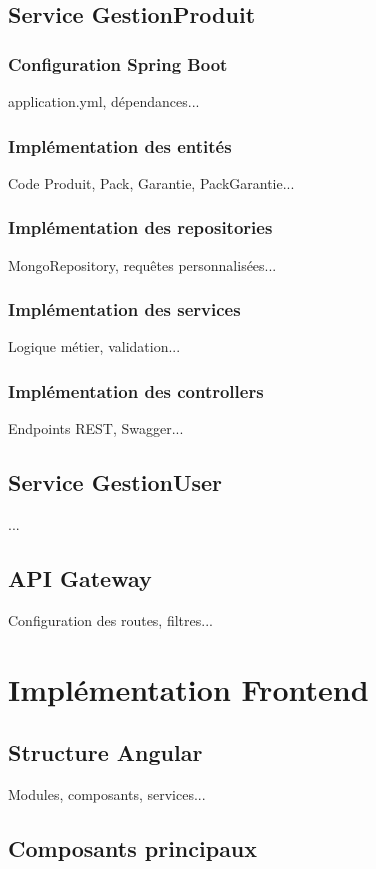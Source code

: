 \documentclass[12pt,a4paper]{report}
\begin{document}
\subsection{Service GestionProduit}
\subsubsection{Configuration Spring Boot}
application.yml, dépendances...

\subsubsection{Implémentation des entités}
Code Produit, Pack, Garantie, PackGarantie...

\subsubsection{Implémentation des repositories}
MongoRepository, requêtes personnalisées...

\subsubsection{Implémentation des services}
Logique métier, validation...

\subsubsection{Implémentation des controllers}
Endpoints REST, Swagger...

\subsection{Service GestionUser}
...

\subsection{API Gateway}
Configuration des routes, filtres...

\section{Implémentation Frontend}
\subsection{Structure Angular}
Modules, composants, services...

\subsection{Composants principaux}
\end{document}
